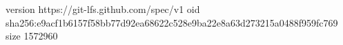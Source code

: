 version https://git-lfs.github.com/spec/v1
oid sha256:e9acf1b6157f58bb77d92ea68622c528e9ba22e8a63d273215a0488f959fc769
size 1572960
